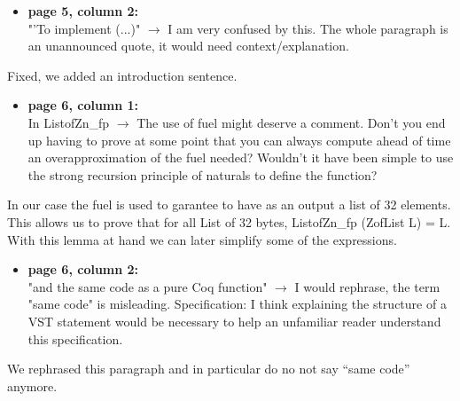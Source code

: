 \begin{itemize}
  \item \textbf{page 5, column 2:}\\
        "'To implement (...)" $\rightarrow$ I am very confused by this. The whole paragraph is an unannounced quote, it would need context/explanation.
\end{itemize}
\begin{answer}
  Fixed, we added an introduction sentence.
\end{answer}

\begin{itemize}
  \item \textbf{page 6, column 1:}\\
        In ListofZn\_fp $\rightarrow$ The use of fuel might deserve a comment. Don't you end up having to prove at some point that you can always compute ahead of time an overapproximation of the fuel needed? Wouldn't it have been simple to use the strong recursion principle of naturals to define the function?
\end{itemize}
\begin{answer}
  In our case the fuel is used to garantee to have as an output a list of 32 elements. This allows us to prove that for all List of 32 bytes, ListofZn\_fp (ZofList L) = L. With this lemma at hand we can later simplify some of the expressions.
\end{answer}

\begin{itemize}
  \item \textbf{page 6, column 2:}\\
        "and the same code as a pure Coq function" $\rightarrow$ I would rephrase, the term "same code" is misleading.
        Specification: I think explaining the structure of a VST statement would be necessary to help an unfamiliar reader understand this specification.
\end{itemize}
\begin{answer}
  We rephrased this paragraph and in particular do no not say ``same code'' anymore.
\end{answer}

